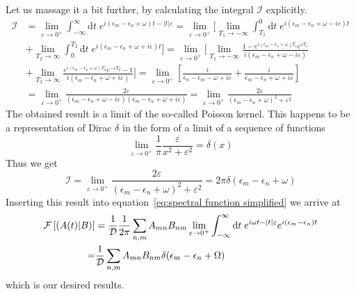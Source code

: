 Let us massage it a bit further, by calculating the integral \(\mathcal{I}\) explicitly.
\begin{align}
    \mathcal{I} & = \lim _{\varepsilon \to 0^+} \int_{-\infty}^{\infty} \mathrm{d} t \;
    e^{ i (\epsilon_m-\epsilon_n+\omega)t -|t| \varepsilon} = \lim _{\varepsilon \to 0^+}
    \Bigg[\lim_{T_1\to -\infty}\int_{T_1}^{0} \mathrm{d} t \; e^{ i (\epsilon_m-\epsilon_n+\omega -i \varepsilon)t}\nonumber         \\
                & +\lim_{T_2\to \infty}\int_{0}^{T_2} \mathrm{d} t \;  e^{ i (\epsilon_m-\epsilon_n+\omega + i\varepsilon)t}\Bigg]
    = \lim _{\varepsilon \to 0^+} \Bigg[\lim_{T_1\to -\infty}
    \frac{1-e^{ i (\epsilon_m-\epsilon_n+\omega )T_1} e^{\varepsilon T_1}}{i (\epsilon_m-\epsilon_n+\omega -i \varepsilon)}\nonumber \\
                & + \lim_{T_2\to \infty} \frac{e^{ i (\epsilon_m-\epsilon_n+\omega )T_2} e^{-\varepsilon T_2}-1}
    {i (\epsilon_m-\epsilon_n+\omega +i \varepsilon)}\Bigg]
    = \lim _{\varepsilon \to 0^+} \left[\frac{i}{\epsilon_n-\epsilon_m-\omega +i \varepsilon} +
    \frac{i}{\epsilon_m-\epsilon_n+\omega +i \varepsilon} \right]\nonumber                                                           \\
                & = \lim _{\varepsilon \to 0^+}
    \frac{2\varepsilon}{(\epsilon_m-\epsilon_n+\omega -i \varepsilon)(\epsilon_m-\epsilon_n+\omega +i \varepsilon)}
    =\lim _{\varepsilon \to 0^+} \frac{2\varepsilon}{(\epsilon_m-\epsilon_n+\omega)^2 +\varepsilon^2}
\end{align}
The obtained result is a limit of the so-called Poisson kernel. This happens to be
a representation of Dirac \(\delta\) in the form of a limit of a sequence of functions~\autocite{byron1992mathematics}
\begin{equation}
    \lim _{\varepsilon \to 0^+} \frac{1}{\pi} \frac{\varepsilon}{x^2 +\varepsilon^2} = \delta(x)
\end{equation}
Thus we get
\begin{equation}
    \mathcal{I} = \lim _{\varepsilon \to 0^+} \frac{2\varepsilon}{(\epsilon_m-\epsilon_n+\omega)^2 +\varepsilon^2}
    = 2\pi \delta(\epsilon_m-\epsilon_n+\omega)
\end{equation}
Inserting this result into equation~\eqref{eq:spectral function simplified} we arrive at
\begin{align}
    \mathcal{F}\left[\left(A(t) \middle| B\right)\right] & = \frac{1}{\mathcal{D}} \frac{1}{2 \pi}\sum_{n,m} A_{mn} B_{nm}
    \lim _{\varepsilon \to 0^+} \int_{-\infty}^{\infty} \mathrm{d} t \; e^{i \omega t-|t|
    \varepsilon}e^{i (\epsilon_m-\epsilon_n) t} \nonumber                                                                    \\
    =                                    & \frac{1}{\mathcal{D}}\sum_{n,m} A_{mn} B_{nm} \delta(\epsilon_m-\epsilon_n+\Omega)
\end{align}
which is our desired results.
